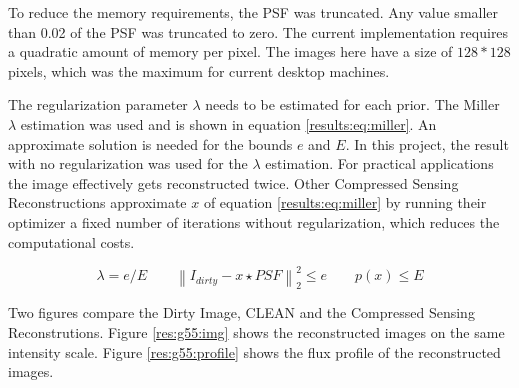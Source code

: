 To reduce the memory requirements, the PSF was truncated. Any value smaller than 0.02 of the PSF was truncated to zero. The current implementation requires a quadratic amount of memory per pixel. The images here have a size of $128*128$ pixels, which was the maximum for current desktop machines.

The regularization parameter $\lambda$ needs to be estimated for each prior. The Miller\cite{miller1970least} $\lambda$ estimation was used and is shown in equation \eqref{results:eq:miller}. An approximate solution is needed for the bounds $e$ and $E$. In this project, the result with no regularization was used for the $\lambda$ estimation. For practical applications the image effectively gets reconstructed twice. Other Compressed Sensing Reconstructions approximate $x$ of equation \eqref{results:eq:miller} by running their optimizer a fixed number of iterations without regularization, which reduces the computational costs.

\begin{equation}\label{results:eq:miller}
	\lambda = e / E \qquad  \left \| I_{dirty} - x \star PSF \right \|_2^2 \le e \qquad p(x) \le E
\end{equation}

Two figures compare the Dirty Image, CLEAN and the Compressed Sensing Reconstrutions. Figure \ref{res:g55:img} shows the reconstructed images on the same intensity scale. Figure \ref{res:g55:profile} shows the flux profile of the reconstructed images.


